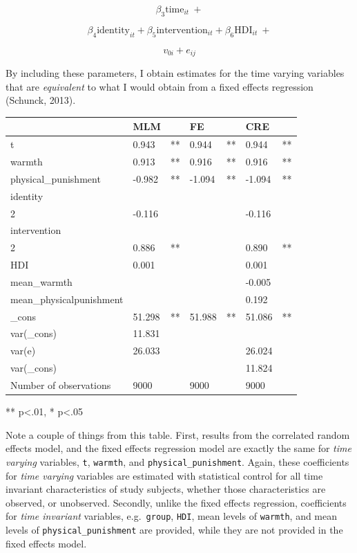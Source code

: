 \documentclass[
  letterpaper,
  DIV=11,
  numbers=noendperiod]{scrreprt}
\begin{document}
\[\beta_3 \text{time}_{it} \ + \]

\[\beta_4 \text{identity}_{it} + \beta_5 \text{intervention}_{it} + \beta_6 \text{HDI}_{it} \ +\]

\[v_{0i} + e_{ij}\]

By including these parameters, I obtain estimates for the time varying
variables that are \emph{equivalent} to what I would obtain from a fixed
effects regression (Schunck, 2013).

\begin{longtable}[]{@{}lllllll@{}}
\toprule\noalign{}
& MLM & & FE & & CRE & \\
\midrule\noalign{}
\endhead
\bottomrule\noalign{}
\endlastfoot
t & 0.943 & ** & 0.944 & ** & 0.944 & ** \\
warmth & 0.913 & ** & 0.916 & ** & 0.916 & ** \\
physical\_punishment & -0.982 & ** & -1.094 & ** & -1.094 & ** \\
identity & & & & & & \\
2 & -0.116 & & & & -0.116 & \\
intervention & & & & & & \\
2 & 0.886 & ** & & & 0.890 & ** \\
HDI & 0.001 & & & & 0.001 & \\
mean\_warmth & & & & & -0.005 & \\
mean\_physicalpunishment & & & & & 0.192 & \\
\_cons & 51.298 & ** & 51.988 & ** & 51.086 & ** \\
var(\_cons) & 11.831 & & & & & \\
var(e) & 26.033 & & & & 26.024 & \\
var(\_cons) & & & & & 11.824 & \\
Number of observations & 9000 & & 9000 & & 9000 & \\
\end{longtable}

** p\textless.01, * p\textless.05

Note a couple of things from this table. First, results from the
correlated random effects model, and the fixed effects regression model
are exactly the same for \emph{time varying} variables, \texttt{t},
\texttt{warmth}, and \texttt{physical\_punishment}. Again, these
coefficients for \emph{time varying} variables are estimated with
statistical control for all time invariant characteristics of study
subjects, whether those characteristics are observed, or unobserved.
Secondly, unlike the fixed effects regression, coefficients for
\emph{time invariant} variables, e.g.~\texttt{group}, \texttt{HDI}, mean
levels of \texttt{warmth}, and mean levels of
\texttt{physical\_punishment} are provided, while they are not provided
in the fixed effects model.
\end{document}
